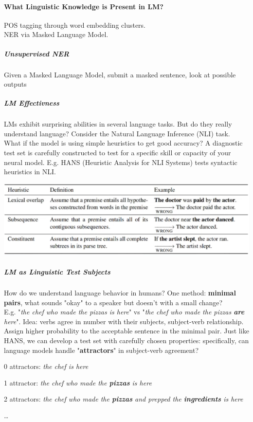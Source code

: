\documentclass[10pt]{report}
\begin{document}
\paragraph{What Linguistic Knowledge is Present in LM?} POS tagging through word embedding clusters.\\
NER via Masked Language Model.
\subparagraph{Unsupervised NER} Given a Masked Language Model, submit a masked sentence, look at possible outputs
\subparagraph{LM Effectivness} LMs exhibit surprising abilities in several language tasks. But do they really understand language? Consider the Natural Language Inference (NLI) task.
What if the model is using simple heuristics to get good accuracy? A diagnostic test set is carefully constructed to test for a specific skill or capacity of your neural model. E.g. HANS (Heuristic Analysis for NLI Systems) tests syntactic heuristics in NLI.
\begin{center}
	\includegraphics[scale=0.5]{78.png}
\end{center}
\subparagraph{LM as Linguistic Test Subjects} How do we understand language behavior in humans? One method: \textbf{minimal pairs}, what sounds "okay" to a speaker but doesn't with a small change?\\
E.g. "\textit{the chef who made the pizzas is here}" vs "\textit{the chef who made the pizzas \textbf{are} here}". Idea: verbs agree in number with their subjects, subject-verb relationship.\\
Assign higher probability to the acceptable sentence in the minimal pair. Just like HANS, we can develop a test set with carefully chosen properties: specifically, can language models handle "\textbf{attractors}" in subject-verb agreement?
\begin{list}{}{}
	\item 0 attractors: \textit{the chef is here}
	\item 1 attractor: \textit{the chef who made the \textbf{pizzas} is here}
	\item 2 attractors: \textit{the chef who made the \textbf{pizzas} and prepped the \textbf{ingredients} is here}
	\item \ldots
\end{list}
\end{document}
